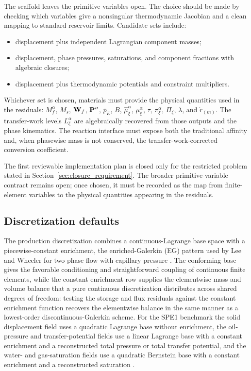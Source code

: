 The scaffold leaves the primitive variables open.  The choice should be made by
checking which variables give a nonsingular thermodynamic Jacobian and a clean
mapping to standard reservoir limits.  Candidate sets include:
\begin{itemize}[leftmargin=*]
	\item displacement plus independent Lagrangian component masses;
	\item displacement, phase pressures, saturations, and component fractions with algebraic closures;
	\item displacement plus thermodynamic potentials and constraint multipliers.
\end{itemize}

Whichever set is chosen, materials must provide the physical quantities used in
the residuals: \(M_f^\alpha\), \(M_s\), \(\mathbf{W}_f\),
\(\mathbf{P}^{\prime\prime}\), \(\bar p_E\), \(B\),
\(\hat\mu_\xi^\alpha\), \(\mu_\xi^\alpha\), \(\tau\),
\(\pi_\xi^\alpha\), \(\Pi_\xi\), \(\lambda\), and \(\dot r_{(m)}\).
The transfer-work levels \(L_\xi^\alpha\) are algebraically recovered from
those outputs and the phase kinematics.  The reaction interface must expose
both the traditional affinity and, when phasewise mass is not conserved, the
transfer-work-corrected conversion coefficient.

The first reviewable implementation plan is closed only for the restricted
problem stated in Section~\ref{sec:closure_requirement}.  The broader
primitive-variable contract remains open; once chosen, it must be recorded as
the map from finite-element variables to the physical quantities appearing in
the residuals.

\subsection{Discretization defaults}
\label{sec:discretization_defaults}

The production discretization combines a continuous-Lagrange base space with a
piecewise-constant enrichment, the enriched-Galerkin (EG) pattern used by
Lee and Wheeler for two-phase flow with capillary pressure \cite{lee2018eg_twophase}.
The conforming base gives the favorable conditioning and straightforward
coupling of continuous finite elements, while the constant enrichment row
supplies the elementwise mass and volume balance that a pure continuous
discretization distributes across shared degrees of freedom: testing the
storage and flux residuals against the constant enrichment function recovers
the elementwise balance in the same manner as a lowest-order
discontinuous-Galerkin scheme.  For the SPE1 benchmark the solid
displacement field uses a quadratic Lagrange base without enrichment, the
oil-pressure and transfer-potential fields use a linear Lagrange base with a
constant enrichment and a reconstructed total pressure or total
transfer potential, and the water- and gas-saturation fields use a quadratic
Bernstein base with a constant enrichment and a reconstructed saturation
\cite{lee2018eg_twophase}.


